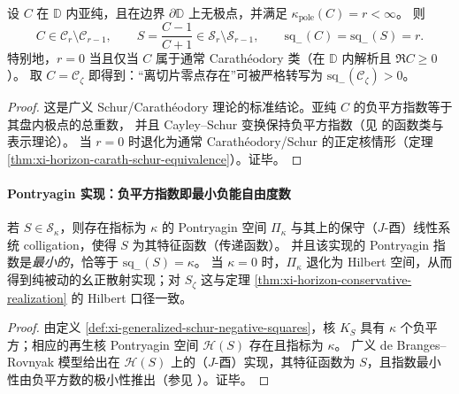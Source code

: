 \begin{theorem}\label{thm:xi-poles-negative-squares-equivalence}
设 \(C\) 在 \(\mathbb{D}\) 内亚纯，且在边界 \(\partial\mathbb{D}\) 上无极点，并满足 \(\kappa_{\mathrm{pole}}(C)=r<\infty\)。
则
\[
C\in\mathcal{C}_{r}\setminus\mathcal{C}_{r-1},
\qquad
S=\frac{C-1}{C+1}\in\mathcal{S}_{r}\setminus\mathcal{S}_{r-1},
\qquad
\mathrm{sq}_-(C)=\mathrm{sq}_-(S)=r.
\]
特别地，\(r=0\) 当且仅当 \(C\) 属于通常 Carath\'eodory 类（在 \(\mathbb{D}\) 内解析且 \(\Re C\ge 0\)）。
取 \(C=\mathscr{C}_{\zeta}\) 即得到：“离切片零点存在”可被严格转写为 \(\mathrm{sq}_-(\mathscr{C}_{\zeta})>0\)。
\end{theorem}

\begin{proof}
这是广义 Schur/Carath\'eodory 理论的标准结论。亚纯 \(C\) 的负平方指数等于其盘内极点的总重数，
并且 Cayley--Schur 变换保持负平方指数（见 \cite{KreinLanger1977ExtensionPiKappaI,AlpayDijksmaRovnyakDeSnoo1997SchurPontryagin} 的函数类与表示理论）。
当 \(r=0\) 时退化为通常 Carath\'eodory/Schur 的正定核情形（定理 \ref{thm:xi-horizon-carath-schur-equivalence}）。证毕。
\end{proof}

\paragraph{Pontryagin 实现：负平方指数即最小负能自由度数}
\begin{theorem}\label{thm:xi-minimal-pontryagin-conservative-realization}
若 \(S\in\mathcal{S}_{\kappa}\)，则存在指标为 \(\kappa\) 的 Pontryagin 空间 \(\Pi_{\kappa}\) 与其上的保守（\(J\)-酉）线性系统 colligation，使得 \(S\) 为其特征函数（传递函数）。
并且该实现的 Pontryagin 指数是\emph{最小的}，恰等于 \(\mathrm{sq}_-(S)=\kappa\)。
当 \(\kappa=0\) 时，\(\Pi_{\kappa}\) 退化为 Hilbert 空间，从而得到纯被动的幺正散射实现；对 \(S_{\zeta}\) 这与定理 \ref{thm:xi-horizon-conservative-realization} 的 Hilbert 口径一致。
\end{theorem}

\begin{proof}
由定义 \ref{def:xi-generalized-schur-negative-squares}，核 \(K_S\) 具有 \(\kappa\) 个负平方；相应的再生核 Pontryagin 空间 \(\mathcal{H}(S)\) 存在且指标为 \(\kappa\)。
广义 de Branges--Rovnyak 模型给出在 \(\mathcal{H}(S)\) 上的（\(J\)-酉）实现，其特征函数为 \(S\)，且指数最小性由负平方数的极小性推出（参见 \cite{AlpayDijksmaRovnyakDeSnoo1997SchurPontryagin}）。证毕。
\end{proof}

